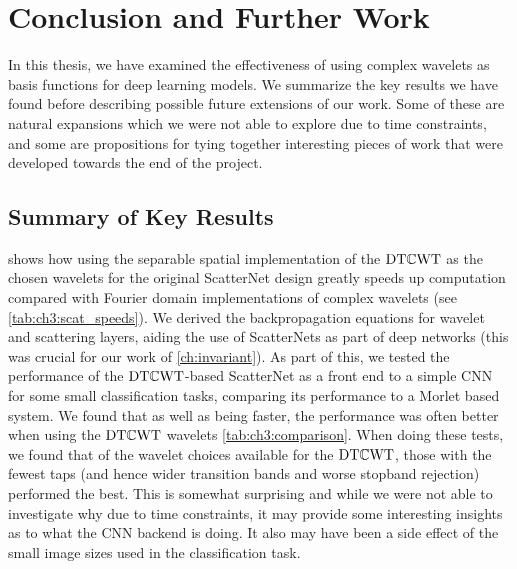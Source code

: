 \chapter{Conclusion and Further Work}\label{ch:conclusion}
\def \path {other/}
\def \imgpath {\path/images}

In this thesis, we have examined the effectiveness of using complex wavelets as
basis functions for deep learning models. We summarize the key results we have
found before describing possible future extensions of our work. Some of these
are natural expansions which we were not able to explore due to time constraints, and some
are propositions for tying together interesting pieces of work that were developed
towards the end of the project.


\section{Summary of Key Results}
\textbf{} shows how using the separable spatial implementation of
the $\mathrm{DT}\mathbb{C}\mathrm{WT}$ as the chosen wavelets for the original ScatterNet design greatly
speeds up computation compared with Fourier domain implementations of complex
wavelets (see \autoref{tab:ch3:scat_speeds}). We
derived the backpropagation equations for wavelet and scattering layers, aiding
the use of ScatterNets as part of deep networks (this was crucial for our work
of \autoref{ch:invariant}). As part of this, we tested
the performance of the $\mathrm{DT}\mathbb{C}\mathrm{WT}$-based ScatterNet as a front end to a simple CNN for
some small classification tasks, comparing its performance to a Morlet based system. We
found that as well as being faster, the performance was often better when using
the $\mathrm{DT}\mathbb{C}\mathrm{WT}$ wavelets \autoref{tab:ch3:comparison}. When doing these tests, we
found that of the wavelet choices available for the $\mathrm{DT}\mathbb{C}\mathrm{WT}$, those with the
fewest taps (and hence wider transition bands and worse stopband rejection)
performed the best. This is somewhat surprising and while we were not able to
investigate why due to time constraints, it may provide some interesting
insights as to what the CNN backend is doing. It also may have been a side
effect of the small image sizes used in the classification task.

